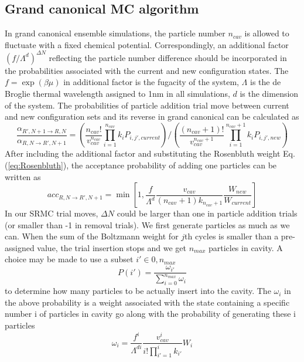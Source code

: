 \documentclass[aip,jcp,12pt]{revtex4-1}
\begin{document}
\subsection{Grand canonical MC algorithm}
In grand canonical ensemble simulations, the particle number $n_{cav}$ is allowed to fluctuate with a fixed chemical potential. Correspondingly, an additional factor $(f/\Lambda^d)^{\Delta N}$ reflecting the particle number difference should be incorporated in the probabilities  associated with the current and new configuration states. The $f=\exp(\beta \mu)$ in additional factor is the fugacity of the system, $\Lambda$  is the de Broglie thermal wavelength assigned to 1nm in all simulations, $d$ is the dimension of the system. The probabilities of particle addition trial move between current and new configuration sets and its reverse in grand canonical can be calculated as
\begin{equation}
\frac{\alpha_{R',N+1\rightarrow R,N}}{\alpha_{R,N\rightarrow R',N+1}} = (\frac{n_{cav}!}{v_{cav}^{n_{cav}}}  \prod\limits_{i=1}^{n_{cav}} k_i P_{i,j',current}) / (\frac{(n_{cav}+1)!}{v_{cav}^{n_{cav}+1}}  \prod\limits_{i=1}^{n_{cav}+1} k_i P_{i,j',new})
\end{equation}
After including the additional factor and substituting the Rosenbluth weight Eq.(\ref{eq:Rosenbluth}), the  acceptance probability of adding one particles can be written as 
\begin{equation}
\label{eq:ordinaryGrandAcc}
acc_{R,N\rightarrow R',N+1} = \min[1,\frac{f}{\Lambda^d} \frac{v_{cav}}{(n_{cav}+1)k_{n_{cav}+1}} \frac{W_{new}}{W_{current}}]
\end{equation}
In our SRMC trial moves, $\Delta N$ could be larger than one in particle addition trials (or smaller than -1 in removal trials). We first generate particles as much as we can. When the sum of the Boltzmann weight for $j$th cycles is smaller than a pre-assigned value, the trial insertion stops and we get $n_{max}$ particles in cavity. A choice may be made to use a subset $i'\in {0,n_{max}}$
\begin{equation}
P(i')=\frac{\omega_{i'}}{\sum\limits_{i=0}^{n_{max}}\omega_i}
\end{equation}
to determine how many particles to be actually insert into the cavity. The $\omega_i$ in the above probability is a weight associated with the state containing a specific number i of particles in cavity go along with the probability of generating these i particles
\begin{equation}
\omega_i = \frac{f^i}{\Lambda^{di}} \frac{v_{cav}^i}{i!\prod\limits_{i'=1}^i k_{i'}} W_i
\end{equation}
\end{document}
